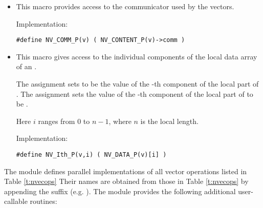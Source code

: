 \begin{itemize}
\item {}

  This macro provides access to the {\mpi} communicator used by the {\nvecp}
  vectors.

  Implementation:

  \verb|#define NV_COMM_P(v) ( NV_CONTENT_P(v)->comm )|

\item {}

  This macro gives access to the individual components of the local data
  array of an .

  The assignment  sets  to be the value of 
  the -th component of the local part of . 
  The assignment    
  sets the value of the -th component of the local part of  
  to be .        
  
  Here $i$ ranges from $0$ to $n-1$, where $n$ is the local length.
      
  Implementation:

  \verb|#define NV_Ith_P(v,i) ( NV_DATA_P(v)[i] )|

\end{itemize}
The {\nvecp} module defines parallel implementations of all vector operations listed 
in Table \ref{t:nvecops}  Their names are obtained from those in Table \ref{t:nvecops}
by appending the suffix  (e.g. ).
The module {\nvecp} provides the following additional
user-callable routines:
